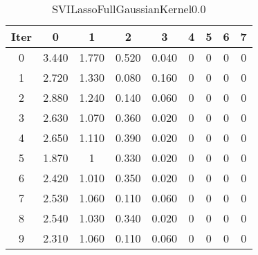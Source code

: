 \begin{table}
	\begin{center}
		\begin{tabular}{|c|c|c|c|c|c|c|c|c|}
			\hline
			Iter & 0 & 1 & 2 & 3 & 4 & 5 & 6 & 7 \\
			\hline
			0 & 3.440 & 1.770 & 0.520 & 0.040 & 0 & 0 & 0 & 0 \\
			\hline
			1 & 2.720 & 1.330 & 0.080 & 0.160 & 0 & 0 & 0 & 0 \\
			\hline
			2 & 2.880 & 1.240 & 0.140 & 0.060 & 0 & 0 & 0 & 0 \\
			\hline
			3 & 2.630 & 1.070 & 0.360 & 0.020 & 0 & 0 & 0 & 0 \\
			\hline
			4 & 2.650 & 1.110 & 0.390 & 0.020 & 0 & 0 & 0 & 0 \\
			\hline
			5 & 1.870 & 1 & 0.330 & 0.020 & 0 & 0 & 0 & 0 \\
			\hline
			6 & 2.420 & 1.010 & 0.350 & 0.020 & 0 & 0 & 0 & 0 \\
			\hline
			7 & 2.530 & 1.060 & 0.110 & 0.060 & 0 & 0 & 0 & 0 \\
			\hline
			8 & 2.540 & 1.030 & 0.340 & 0.020 & 0 & 0 & 0 & 0 \\
			\hline
			9 & 2.310 & 1.060 & 0.110 & 0.060 & 0 & 0 & 0 & 0 \\
			\hline
		\end{tabular}
	\end{center}
	\caption{SVILassoFullGaussianKernel0.0}
\end{table}
